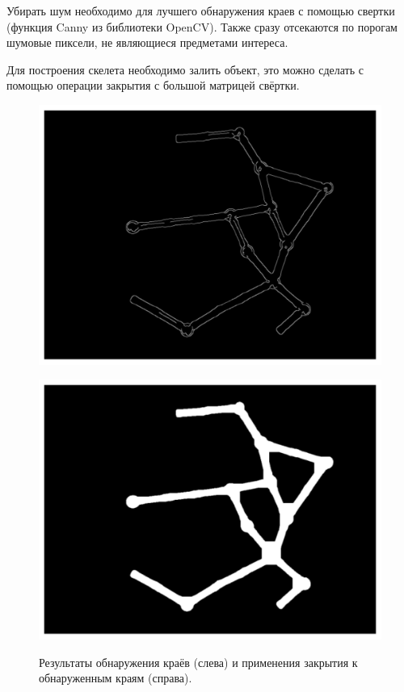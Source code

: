 \documentclass[10pt]{article}
\begin{document}
	Убирать шум необходимо для лучшего обнаружения краев с помощью свертки (функция Canny из библиотеки OpenCV). Также сразу отсекаются по порогам шумовые пиксели, не являющиеся предметами интереса.
	
	Для построения скелета необходимо залить объект, это можно сделать с помощью операции закрытия с большой матрицей свёртки.
	
	\begin{figure}[h]
			\begin{minipage}[h]{0.36\linewidth}
					{\includegraphics[width=1.0\linewidth]{data/edges.pdf}}
			\end{minipage}
		\hfill
			\begin{minipage}[h]{0.36\linewidth}
				{\includegraphics[width=1.0\linewidth]{data/inter_bin.pdf}}
			\end{minipage}
		
		\caption{Результаты обнаружения краёв (слева) и применения закрытия к обнаруженным краям (справа).}
		\label{ris:image5}
	\end{figure}
	
\end{document}
